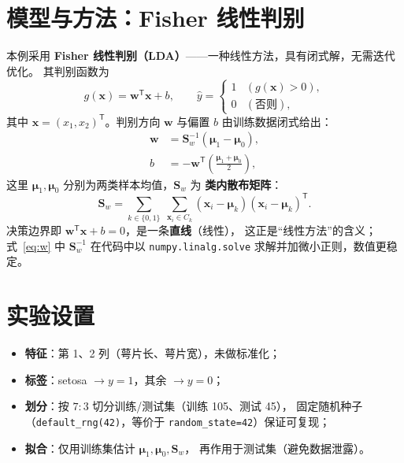 \documentclass[UTF8, 11pt]{ctexart}
\begin{document}
\section{模型与方法：Fisher 线性判别}
\label{sec:model}

本例采用 \textbf{Fisher 线性判别（LDA）}——一种线性方法，具有闭式解，无需迭代优化。
其判别函数为
\begin{equation}
  g(\mathbf{x}) = \mathbf{w}^{\mathsf{T}}\mathbf{x} + b,
  \qquad
  \hat{y} = \begin{cases}
    1 & (g(\mathbf{x}) > 0),\\[2pt]
    0 & (\text{否则}),
  \end{cases}
  \label{eq:g}
\end{equation}
其中 $\mathbf{x}=(x_1,x_2)^{\mathsf{T}}$。判别方向 $\mathbf{w}$ 与偏置 $b$ 由训练数据闭式给出：
\begin{align}
  \mathbf{w} &= \mathbf{S}_w^{-1}(\boldsymbol{\mu}_1 - \boldsymbol{\mu}_0),\label{eq:w}\\
  b &= -\mathbf{w}^{\mathsf{T}}\!\left(\frac{\boldsymbol{\mu}_1+\boldsymbol{\mu}_0}{2}\right),\label{eq:b}
\end{align}
这里 $\boldsymbol{\mu}_1,\boldsymbol{\mu}_0$ 分别为两类样本均值，$\mathbf{S}_w$ 为
\textbf{类内散布矩阵}：
\begin{equation}
  \mathbf{S}_w = \sum_{k\in\{0,1\}}\;
                 \sum_{\mathbf{x}_i \in C_k}
                 (\mathbf{x}_i - \boldsymbol{\mu}_k)(\mathbf{x}_i - \boldsymbol{\mu}_k)^{\mathsf{T}}.
  \label{eq:sw}
\end{equation}
决策边界即 $\mathbf{w}^{\mathsf{T}}\mathbf{x}+b=0$，是一条\textbf{直线}（线性），
这正是“线性方法”的含义；式~\eqref{eq:w} 中 $\mathbf{S}_w^{-1}$ 在代码中以
\texttt{numpy.linalg.solve} 求解并加微小正则，数值更稳定。

\section{实验设置}
\label{sec:setup}
\begin{itemize}
  \item \textbf{特征}：第 1、2 列（萼片长、萼片宽），未做标准化；
  \item \textbf{标签}：setosa $\to y=1$，其余 $\to y=0$；
  \item \textbf{划分}：按 $7:3$ 切分训练/测试集（训练 105、测试 45），
        固定随机种子（\verb|default_rng(42)|，等价于 \verb|random_state=42|）保证可复现；
  \item \textbf{拟合}：仅用训练集估计 $\boldsymbol{\mu}_1,\boldsymbol{\mu}_0,\mathbf{S}_w$，
        再作用于测试集（避免数据泄露）。
\end{itemize}
\end{document}
